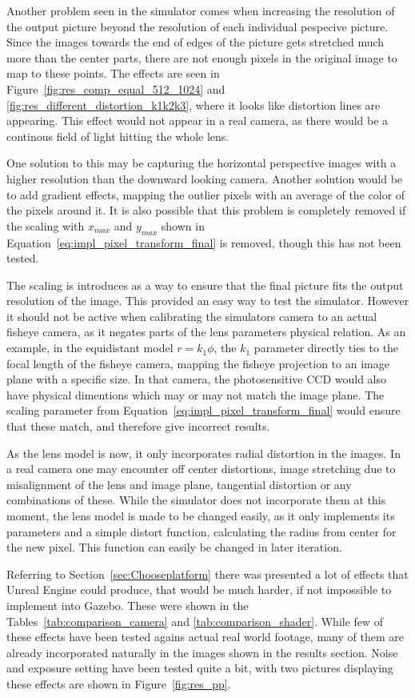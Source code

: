 Another problem seen in the simulator comes when increasing the resolution of the output picture beyond the resolution of each individual pespecive picture. Since the images towards the end of edges of the picture gets stretched much more than the center parts, there are not enough pixels in the original image to map to these points. The effects are seen in Figure~\ref{fig:res_comp_equal_512_1024} and \ref{fig:res_different_distortion_k1k2k3}, where it looks like distortion lines are appearing. This effect would not appear in a real camera, as there would be a continous field of light hitting the whole lens. 

One solution to this may be capturing the horizontal perspective images with a higher resolution than the downward looking camera. Another solution would be to add gradient effects, mapping the outlier pixels with an average of the color of the pixels around it. It is also possible that this problem is completely removed if the scaling with $x_{max}$ and $y_{max}$ shown in Equation~\eqref{eq:impl_pixel_transform_final} is removed, though this has not been tested. 

The scaling is introduces as a way to ensure that the final picture fits the output resolution of the image. This provided an easy way to test the simulator. However it should not be active when calibrating the simulators camera to an actual fisheye camera, as it negates parts of the lens parameters physical relation. As an example, in the equidistant model $r=k_1 \phi$, the $k_1$ parameter directly ties to the focal length of the fisheye camera, mapping the fisheye projection to an image plane with a specific size. In that camera, the photosensitive CCD would also have physical dimentions which may or may not match the image plane. The scaling parameter from Equation~\eqref{eq:impl_pixel_transform_final} would ensure that these match, and therefore give incorrect results.

As the lens model is now, it only incorporates radial distortion in the images. In a real camera one may encounter off center distortions, image stretching due to misalignment of the lens and image plane, tangential distortion or any combinations of these. While the simulator does not incorporate them at this moment, the lens model is made to be changed easily, as it only implements its parameters and a simple distort function, calculating the radius from center for the new pixel. This function can easily be changed in later iteration.

Referring to Section~\ref{sec:Chooseplatform} there was presented a lot of effects that Unreal Engine could produce, that would be much harder, if not impossible to implement into Gazebo. These were shown in the Tables~\ref{tab:comparison_camera} and \ref{tab:comparison_shader}. While few of these effects have been tested agains actual real world footage, many of them are already incorporated naturally in the images shown in the results section. Noise and exposure setting have been tested quite a bit, with two pictures displaying these effects are shown in Figure~\ref{fig:res_pp}.

